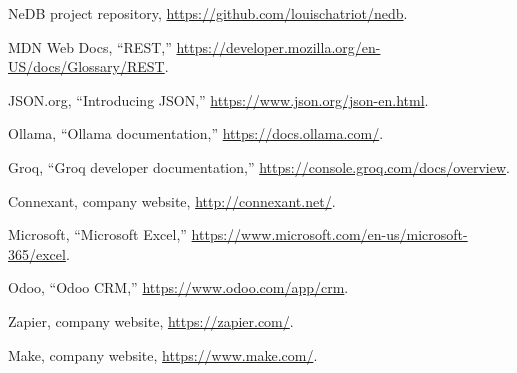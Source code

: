 \documentclass[12pt,a4paper,oneside]{report}
\begin{document}
\begin{enumerate}[label={\textup{[W\arabic*]}}, leftmargin=1.5cm]
\item NeDB project repository, \url{https://github.com/louischatriot/nedb}.
\item MDN Web Docs, ``REST,'' \url{https://developer.mozilla.org/en-US/docs/Glossary/REST}.
\item JSON.org, ``Introducing JSON,'' \url{https://www.json.org/json-en.html}.
\item Ollama, ``Ollama documentation,'' \url{https://docs.ollama.com/}.
\item Groq, ``Groq developer documentation,'' \url{https://console.groq.com/docs/overview}.
\item Connexant, company website, \url{http://connexant.net/}.
\item Microsoft, ``Microsoft Excel,'' \url{https://www.microsoft.com/en-us/microsoft-365/excel}.
\item Odoo, ``Odoo CRM,'' \url{https://www.odoo.com/app/crm}.
\item Zapier, company website, \url{https://zapier.com/}.
\item Make, company website, \url{https://www.make.com/}.
\end{enumerate}


\end{document}
